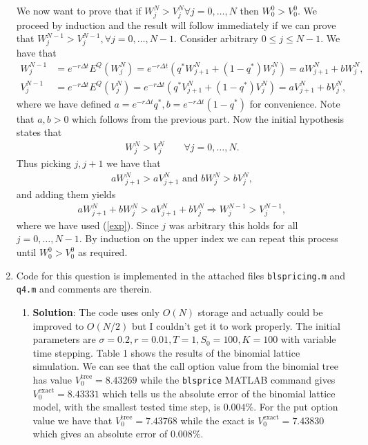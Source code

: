 \documentclass[10pt,english]{article}
\theoremstyle{plain}
\newcommand{\dt}{\Delta t}
\begin{document}
\begin{enumerate}
We now want to prove that if $W^{N}_{j}>V^{N}_{j} \forall j=0,\ldots,N$ then $W^{0}_{0}>V^{0}_{0}$. We proceed by induction and the result will follow immediately if we can prove that $W^{N-1}_{j}>V^{N-1}_{j}, \forall j=0,\ldots, N-1$. Consider arbitrary $0\le j\le N-1$. We have that
\begin{align}
W^{N-1}_{j}&=e^{-r\dt}E^{Q}(W^{N}_{j}) = e^{-r\dt}(q^{*}W^{N}_{j+1}+(1-q^{*})W^{N}_{j})=aW^{N}_{j+1}+bW^{N}_{j},\nonumber\\
V^{N-1}_{j}&=e^{-r\dt}E^{Q}(V^{N}_{j}) = e^{-r\dt}(q^{*}V^{N}_{j+1}+(1-q^{*})V^{N}_{j})=aV^{N}_{j+1}+bV^{N}_{j},\label{exp}
\end{align}
where we have defined $a=e^{-r\dt}q^{*},b=e^{-r\dt}(1-q^{*})$ for convenience. Note that $a,b>0$ which follows from the previous part. Now the initial hypothesis states that
\begin{align*}
W^{N}_{j}>V^{N}_{j}\qquad \forall j=0,\ldots,N.
\end{align*}
Thus picking $j,j+1$ we have that
\begin{align*}
aW^{N}_{j+1}>aV^{N}_{j+1} \text{ and } bW^{N}_{j}>bV^{N}_{j},
\end{align*}
and adding them yields
\begin{align*}
aW^{N}_{j+1}+bW^{N}_{j} > aV^{N}_{j+1} + bV^{N}_{j}\Rightarrow W^{N-1}_{j} > V^{N-1}_{j},
\end{align*}
where we have used (\ref{exp}). Since $j$ was arbitrary this holds for all $j=0,\ldots,N-1$. By induction on the upper index we can repeat this process until $W^{0}_{0}>V^{0}_{0}$ as required.

\item Code for this question is implemented in the attached files \texttt{blspricing.m} and \texttt{q4.m} and comments are therein.
\begin{enumerate}
\item \textbf{Solution}: The code uses only $O(N)$ storage and actually could be improved to $O(N/2)$ but I couldn't get it to work properly. The initial parameters are $\sigma=0.2,r=0.01,T=1,S_{0}=100,K=100$ with variable time stepping. Table 1 shows the results of the binomial lattice simulation. We can see that the call option value from the binomial tree has value $V^{\text{tree}}_{0}=8.43269$ while the \texttt{blsprice} MATLAB command gives $V^{\text{exact}}_{0}=8.43331$ which tells us the absolute error of the binomial lattice model, with the smallest tested time step, is $0.004\%$. For the put option value we have that $V^{\text{tree}}_{0}=7.43768$ while the exact is $V^{\text{exact}}_{0}=7.43830$ which gives an absolute error of $0.008\%$. 


\end{enumerate}
\end{enumerate}
\end{document}
